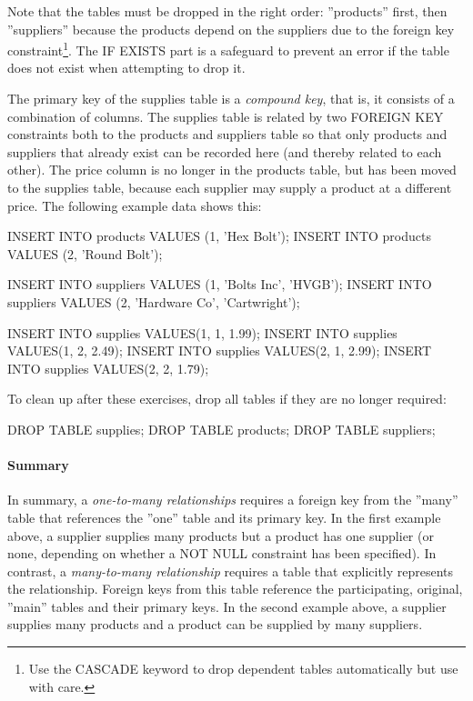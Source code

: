 Note that the tables must be dropped in the right order: ''products'' first, then ''suppliers'' because the products depend on the suppliers due to the foreign key constraint\footnote{Use the CASCADE keyword to drop dependent tables automatically but use with care.}. The IF EXISTS part is a safeguard to prevent an error if the table does not exist when attempting to drop it.

The primary key of the supplies table is a \emph{compound key}, that is, it consists of a combination of columns. The supplies table is related by two FOREIGN KEY constraints both to the products and suppliers table so that only products and suppliers that already exist can be recorded here (and thereby related to each other). The price column is no longer in the products table, but has been moved to the supplies table, because each supplier may supply a product at a different price. The following example data shows this:

\begin{samepage}
\begin{sqlcode}
INSERT INTO products VALUES (1, 'Hex Bolt');
INSERT INTO products VALUES (2, 'Round Bolt');

INSERT INTO suppliers VALUES (1, 'Bolts Inc', 'HVGB');
INSERT INTO suppliers VALUES (2, 'Hardware Co', 'Cartwright');

INSERT INTO supplies VALUES(1, 1, 1.99);
INSERT INTO supplies VALUES(1, 2, 2.49);
INSERT INTO supplies VALUES(2, 1, 2.99);
INSERT INTO supplies VALUES(2, 2, 1.79);
\end{sqlcode}
\end{samepage}

\noindent To clean up after these exercises, drop all tables if they are no longer required:

\begin{samepage}
\begin{sqlcode}
DROP TABLE supplies;
DROP TABLE products;
DROP TABLE suppliers;
\end{sqlcode}
\end{samepage}


\paragraph*{Summary} In summary, a \emph{one-to-many relationships} requires a foreign key from the ''many'' table that references the ''one'' table and its primary key. In the first example above, a supplier supplies many products but a product has one supplier (or none, depending on whether a NOT NULL constraint has been specified). In contrast, a \emph{many-to-many relationship} requires a table that explicitly represents the relationship. Foreign keys from this table reference the participating, original, ''main'' tables and their primary keys. In the second example above, a supplier supplies many products and a product can be supplied by many suppliers. 

